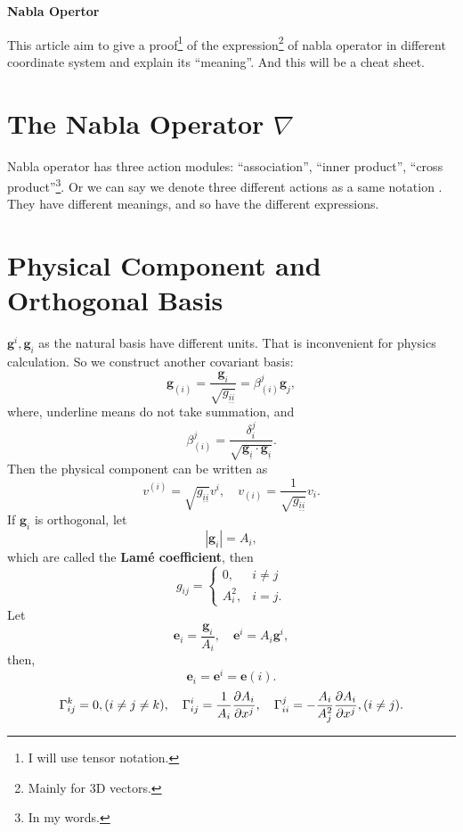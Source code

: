 \documentclass{article}
\theoremstyle{1}
\theoremstyle{2}
\newcommand{\pa}{\partial}
\begin{document}
\begin{center}
    \huge{\textbf{Nabla Opertor}}
\end{center}

This article aim to give a proof\footnote{I will use tensor notation.}  of the expression\footnote{Mainly for 3D vectors.} of nabla operator in different coordinate system and explain its ``meaning''. And this will be a cheat sheet.
\section{The Nabla Operator $\nabla$}
Nabla operator has three action modules: ``association'', ``inner product'', ``cross product''\footnote{In my words.}. Or we can say we denote three different actions as a same notation .
They have different meanings, and so have the different expressions. 


\section{Physical Component and Orthogonal Basis}
$\mathbf{g}^i,\mathbf{g}_i$ as the natural basis have different units. That is inconvenient for physics calculation. So we construct another covariant basis:
\begin{equation}
    \mathbf{g}_{(i)}=\frac{\mathbf{g}_i}{\sqrt{g_{\underline{i}\underline{i}}}}=\beta^j_{(i)}\mathbf{g}_j,
\end{equation}
where, underline means do not take summation, and 
\begin{equation}
    \beta^j_{(i)}=\frac{\delta^j_i}{\sqrt{\mathbf{g}_{\underline{i}}\cdot\mathbf{g}_{\underline{i}}}}.
\end{equation}
Then the physical component can be written as
\begin{equation}
    v^{(i)}=\sqrt{g_{\underline{i}\underline{i}}}v^i,\quad v_{(i)}=\frac{1}{\sqrt{g_{\underline{i}\underline{i}}}}v_i.
\end{equation}
If $\mathbf{g}_i$ is orthogonal, let 
\begin{equation}
    \left|\mathbf{g}_i\right|=A_i,
\end{equation}
which are called the \textbf{Lamé coefficient}, then
\begin{equation}
    g_{ij}=\left\{
    \begin{matrix}
        0,&i\not=j\\
        A_i^2,&i=j.
    \end{matrix}
    \right.
\end{equation}
Let 
\begin{equation}
    \mathbf{e}_i=\frac{\mathbf{g}_i}{A_i},\quad \mathbf{e}^i=A_i\mathbf{g}^i,
\end{equation}
then,
\begin{equation}
    \mathbf{e}_i=\mathbf{e}^i=\mathbf{e}(i).
\end{equation}
\begin{equation}
    \Gamma_{ij}^k=0,(i\not=j\not=k),\quad \Gamma_{ij}^i=\frac{1}{A_i}\frac{\pa A_i}{\pa x^j}, \quad \Gamma_{ii}^j=-\frac{A_i}{A_j^2}\pdv{A_i}{x^j},(i\not=j).
\end{equation}
\end{document}
